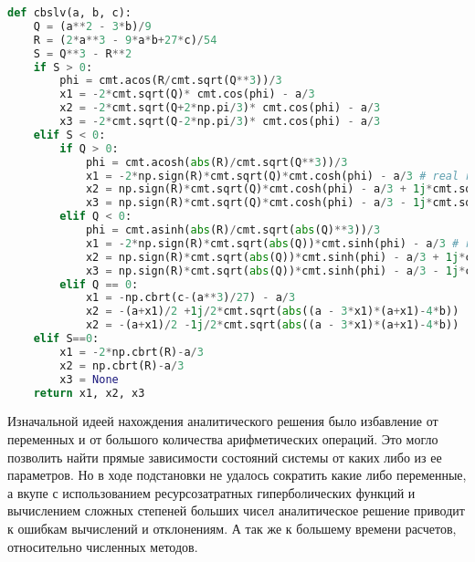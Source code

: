 \newpage
\begin{lstlisting}[numbers=none, label=lst:viett,language=Python, caption=Программная реализация решателя кубического уравнения при помощи теоремы Виета]
def cbslv(a, b, c):
	Q = (a**2 - 3*b)/9
	R = (2*a**3 - 9*a*b+27*c)/54
	S = Q**3 - R**2
	if S > 0:
		phi = cmt.acos(R/cmt.sqrt(Q**3))/3
		x1 = -2*cmt.sqrt(Q)* cmt.cos(phi) - a/3
		x2 = -2*cmt.sqrt(Q+2*np.pi/3)* cmt.cos(phi) - a/3
		x3 = -2*cmt.sqrt(Q-2*np.pi/3)* cmt.cos(phi) - a/3
	elif S < 0:
		if Q > 0:
			phi = cmt.acosh(abs(R)/cmt.sqrt(Q**3))/3
			x1 = -2*np.sign(R)*cmt.sqrt(Q)*cmt.cosh(phi) - a/3 # real root
			x2 = np.sign(R)*cmt.sqrt(Q)*cmt.cosh(phi) - a/3 + 1j*cmt.sqrt(3)*cmt.sqrt(Q)*cmt.sinh(phi)
			x3 = np.sign(R)*cmt.sqrt(Q)*cmt.cosh(phi) - a/3 - 1j*cmt.sqrt(3)*cmt.sqrt(Q)*cmt.sinh(phi)
		elif Q < 0:
			phi = cmt.asinh(abs(R)/cmt.sqrt(abs(Q)**3))/3
			x1 = -2*np.sign(R)*cmt.sqrt(abs(Q))*cmt.sinh(phi) - a/3 # real root
			x2 = np.sign(R)*cmt.sqrt(abs(Q))*cmt.sinh(phi) - a/3 + 1j*cmt.sqrt(3)*cmt.sqrt(abs(Q))*cmt.cosh(phi)
			x3 = np.sign(R)*cmt.sqrt(abs(Q))*cmt.sinh(phi) - a/3 - 1j*cmt.sqrt(3)*cmt.sqrt(abs(Q))*cmt.cosh(phi)
		elif Q == 0:
			x1 = -np.cbrt(c-(a**3)/27) - a/3
			x2 = -(a+x1)/2 +1j/2*cmt.sqrt(abs((a - 3*x1)*(a+x1)-4*b))
			x2 = -(a+x1)/2 -1j/2*cmt.sqrt(abs((a - 3*x1)*(a+x1)-4*b))
	elif S==0:
		x1 = -2*np.cbrt(R)-a/3
		x2 = np.cbrt(R)-a/3
		x3 = None
	return x1, x2, x3
\end{lstlisting}

Изначальной идеей нахождения аналитического решения было избавление от переменных и от большого количества арифметических операций. Это могло позволить найти прямые зависимости состояний системы от каких либо из ее параметров. Но в ходе подстановки не удалось сократить какие либо переменные, а вкупе с использованием ресурсозатратных гиперболических функций и вычислением сложных степеней больших чисел аналитическое решение приводит к ошибкам вычислений и отклонениям. А так же к большему времени расчетов, относительно численных методов.
